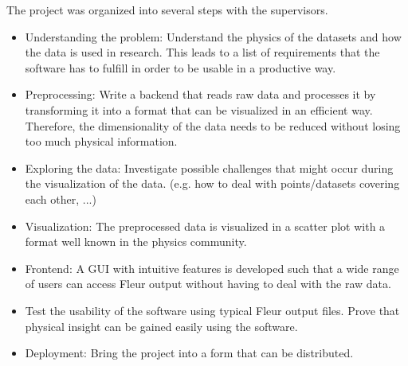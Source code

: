 The project was organized into several steps with the supervisors.
\begin{itemize}
\item Understanding the problem: Understand the physics of the datasets and how
    the data is used in research. This leads to a list of requirements that the
    software has to fulfill in order to be usable in a productive way.
\item Preprocessing: Write a backend that reads raw data and processes it by transforming it into a format that can be visualized in an efficient way. Therefore, the dimensionality of the data needs to be reduced without losing too much physical information.
\item Exploring the data: Investigate possible challenges that might occur during the visualization of the data. (e.g. how to deal with points/datasets covering each other, ...)
\item Visualization: The preprocessed data is visualized in a scatter plot with
    a format well known in the physics community.
\item Frontend: A GUI with intuitive features is developed such that a wide
    range of users can access Fleur output without having to deal with the raw data. 
\item Test the usability of the software using typical Fleur output files. Prove that physical insight can be gained easily using the software.
\item Deployment: Bring the project into a form that can be distributed.
\end{itemize}


